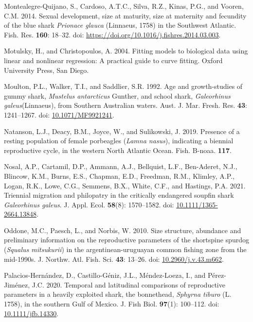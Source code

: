 \documentclass[
]{article}
\newenvironment{CSLReferences}%
  {}%
  {\par}
\begin{document}
\begin{CSLReferences}{1}{0}
Montealegre-Quijano, S., Cardoso, A.T.C., Silva, R.Z., Kinas, P.G., and Vooren, C.M. 2014. Sexual development, size at maturity, size at maternity and fecundity of the blue shark \emph{{Prionace} glauca} ({Linnaeus}, 1758) in the {Southwest} {Atlantic}. Fish. Res. \textbf{160}: 18--32. doi: \url{https://doi.org/10.1016/j.fishres.2014.03.003}.

Motulsky, H., and Christopoulos, A. 2004. Fitting models to biological data using linear and nonlinear regression: A practical guide to curve fitting. Oxford University Press, San Diego.

Moulton, P.L., Walker, T.I., and Saddlier, S.R. 1992. Age and growth-studies of gummy shark, \emph{{Mustelus} antarcticus} {Gunther}, and school shark, \emph{{Galeorhinus} galeus}({Linnaeus}), from {Southern} {Australian} waters. Aust. J. Mar. Fresh. Res. \textbf{43}: 1241--1267. doi: \href{https://doi.org/10.1071/MF9921241}{10.1071/MF9921241}.

Natanson, L.J., Deacy, B.M., Joyce, W., and Sulikowski, J. 2019. Presence of a resting population of female porbeagles (\emph{{Lamna} nasus}), indicating a biennial reproductive cycle, in the western {North} {Atlantic} {Ocean}. Fish. B-noaa. \textbf{117}.

Nosal, A.P., Cartamil, D.P., Ammann, A.J., Bellquist, L.F., Ben-Aderet, N.J., Blincow, K.M., Burns, E.S., Chapman, E.D., Freedman, R.M., Klimley, A.P., Logan, R.K., Lowe, C.G., Semmens, B.X., White, C.F., and Hastings, P.A. 2021. Triennial migration and philopatry in the critically endangered soupfin shark {\emph{Galeorhinus galeus}}. J. Appl. Ecol. \textbf{58}(8): 1570--1582. doi: \href{https://doi.org/10.1111/1365-2664.13848}{10.1111/1365-2664.13848}.

Oddone, M.C., Paesch, L., and Norbis, W. 2010. Size structure, abundance and preliminary information on the reproductive parameters of the shortspine spurdog (\emph{{Squalus} mitsukurii}) in the argentinean-uruguayan common fishing zone from the mid-1990s. J. Northw. Atl. Fish. Sci. \textbf{43}: 13--26. doi: \href{https://doi.org/10.2960/j.v.43.m662}{10.2960/j.v.43.m662}.

Palacios-Hernández, D., Castillo-Géniz, J.L., Méndez-Loeza, I., and Pérez-Jiménez, J.C. 2020. Temporal and latitudinal comparisons of reproductive parameters in a heavily exploited shark, the bonnethead, \emph{{Sphyrna} tiburo} ({L}. 1758), in the southern {Gulf} of {Mexico}. J. Fish Biol. \textbf{97}(1): 100--112. doi: \href{https://doi.org/10.1111/jfb.14330}{10.1111/jfb.14330}.


\end{CSLReferences}
\end{document}
